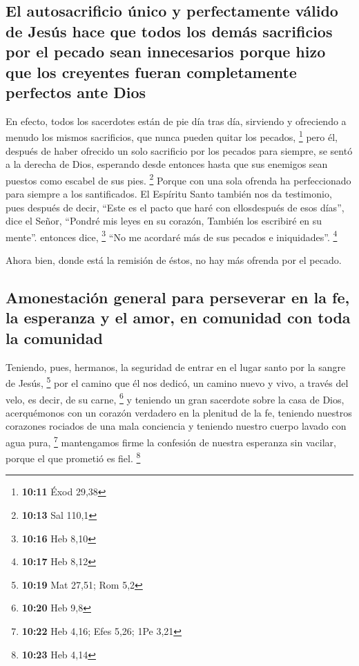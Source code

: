 \begin{paracol}{2}
\hypertarget{el-autosacrificio-uxfanico-y-perfectamente-vuxe1lido-de-jesuxfas-hace-que-todos-los-demuxe1s-sacrificios-por-el-pecado-sean-innecesarios-porque-hizo-que-los-creyentes-fueran-completamente-perfectos-ante-dios}{%
\subsection{El autosacrificio único y perfectamente válido de Jesús hace
que todos los demás sacrificios por el pecado sean innecesarios porque
hizo que los creyentes fueran completamente perfectos ante
Dios}\label{el-autosacrificio-uxfanico-y-perfectamente-vuxe1lido-de-jesuxfas-hace-que-todos-los-demuxe1s-sacrificios-por-el-pecado-sean-innecesarios-porque-hizo-que-los-creyentes-fueran-completamente-perfectos-ante-dios}}

 En efecto, todos los sacerdotes están de pie día tras
día, sirviendo y ofreciendo a menudo los mismos sacrificios, que nunca
pueden quitar los pecados, \footnote{\textbf{10:11} Éxod 29,38}
 pero él, después de haber ofrecido un solo sacrificio
por los pecados para siempre, se sentó a la derecha de Dios,
 esperando desde entonces hasta que sus enemigos sean
puestos como escabel de sus pies. \footnote{\textbf{10:13} Sal 110,1}
 Porque con una sola ofrenda ha perfeccionado para
siempre a los santificados.  El Espíritu Santo también
nos da testimonio, pues después de decir,  ``Este es el
pacto que haré con ellosdespués de esos días'', dice el Señor, ``Pondré
mis leyes en su corazón, También los escribiré en su mente''. entonces
dice, \footnote{\textbf{10:16} Heb 8,10}  ``No me
acordaré más de sus pecados e iniquidades''. \footnote{\textbf{10:17}
  Heb 8,12}

 Ahora bien, donde está la remisión de éstos, no hay más
ofrenda por el pecado.

\hypertarget{amonestaciuxf3n-general-para-perseverar-en-la-fe-la-esperanza-y-el-amor-en-comunidad-con-toda-la-comunidad}{%
\subsection{Amonestación general para perseverar en la fe, la esperanza
y el amor, en comunidad con toda la
comunidad}\label{amonestaciuxf3n-general-para-perseverar-en-la-fe-la-esperanza-y-el-amor-en-comunidad-con-toda-la-comunidad}}

 Teniendo, pues, hermanos, la seguridad de entrar en el
lugar santo por la sangre de Jesús, \footnote{\textbf{10:19} Mat 27,51;
  Rom 5,2}  por el camino que él nos dedicó, un camino
nuevo y vivo, a través del velo, es decir, de su carne, \footnote{\textbf{10:20}
  Heb 9,8}  y teniendo un gran sacerdote sobre la casa de
Dios,  acerquémonos con un corazón verdadero en la
plenitud de la fe, teniendo nuestros corazones rociados de una mala
conciencia y teniendo nuestro cuerpo lavado con agua pura, \footnote{\textbf{10:22}
  Heb 4,16; Efes 5,26; 1Pe 3,21}  mantengamos firme la
confesión de nuestra esperanza sin vacilar, porque el que prometió es
fiel. \footnote{\textbf{10:23} Heb 4,14}


\end{paracol}
